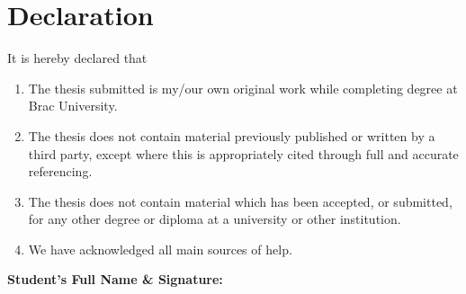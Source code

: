 \newcommand*\wildcard[2][6cm]{\vspace{2cm}\parbox{#1}{\hrulefill\par#2}} 


\section*{Declaration}

It is hereby declared that

\begin{enumerate} %
  \item The thesis submitted is my/our own original work while completing degree at Brac University.
  \item The thesis does not contain material previously published or written by a third party, except where this is appropriately cited through full and accurate referencing.
  \item The thesis does not contain material which has been accepted, or submitted, for any other degree or diploma at a university or other institution.
  \item We have acknowledged all main sources of help.
\end{enumerate}

\vspace{1cm}
\textbf{Student’s Full Name \& Signature:} %


\begingroup


